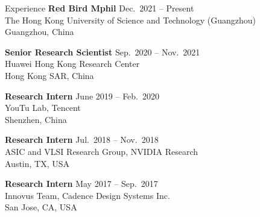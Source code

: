 
\begin{rSection}{Experience}
{\bf Red Bird Mphil}         \hfill { Dec.~2021 -- Present} \\
The Hong Kong University of Science and Technology (Guangzhou) \\
Guangzhou, China

{\bf Senior Research Scientist}         \hfill { Sep.~2020 -- Nov.~2021} \\
Huawei Hong Kong Research Center\\
Hong Kong SAR, China

{\bf Research Intern}         \hfill { June 2019 -- Feb.~2020} \\
YouTu Lab, Tencent\\
Shenzhen, China

{\bf Research Intern}               \hfill { Jul.~2018 -- Nov.~2018} \\
ASIC and VLSI Research Group, NVIDIA Research\\
Austin, TX, USA

{\bf Research Intern}               \hfill { May 2017 -- Sep.~2017} \\
Innovus Team, Cadence Design Systems Inc.\\
San Jose, CA, USA


\end{rSection}


